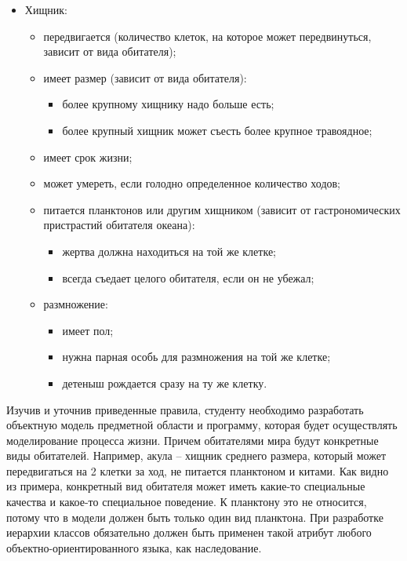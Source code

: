 \documentclass[a4paper,12pt]{article}
\begin{document}
\begin{itemize}
\item Хищник:
  \begin{itemize}
  \item передвигается (количество клеток, на которое может
    передвинуться, зависит от вида обитателя);
  \item имеет размер (зависит от вида обитателя):
    \begin{itemize}
    \item более крупному хищнику надо больше есть;
    \item более крупный хищник может съесть более крупное травоядное;
    \end{itemize}
  \item имеет срок жизни;
  \item может умереть, если голодно определенное количество ходов;
  \item питается планктонов или другим хищником (зависит от
    гастрономических пристрастий обитателя океана):
    \begin{itemize}
    \item жертва должна находиться на той же клетке;
    \item всегда съедает целого обитателя, если он не убежал;
    \end{itemize}
  \item размножение:
    \begin{itemize}
    \item имеет пол;
    \item нужна парная особь для размножения на той же клетке;
    \item детеныш рождается сразу на ту же клетку.
    \end{itemize}
  \end{itemize}
\end{itemize}

Изучив и уточнив приведенные правила, студенту необходимо разработать
объектную модель предметной области и программу, которая будет
осуществлять моделирование процесса жизни. Причем обитателями мира
будут конкретные виды обитателей. Например, акула – хищник среднего
размера, который может передвигаться на 2 клетки за ход, не питается
планктоном и китами. Как видно из примера, конкретный вид обитателя
может иметь какие-то специальные качества и какое-то специальное
поведение. К планктону это не относится, потому что в модели должен
быть только один вид планктона. При разработке иерархии классов
обязательно должен быть применен такой атрибут любого
объектно-ориентированного языка, как наследование.
\end{document}
